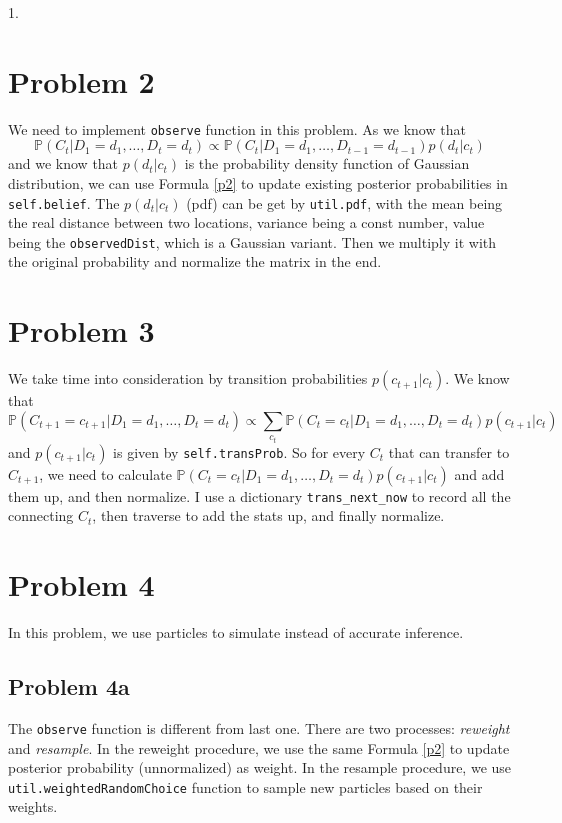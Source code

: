 \documentclass[paper=a4, fontsize=10pt]{scrartcl} %
\numberwithin{equation}{section} %
\numberwithin{figure}{section} %
\numberwithin{table}{section} %
\begin{document}
\begin{spacing}{1.}
\section{Problem 2}
We need to implement \texttt{observe} function in this problem. As we know that
\begin{equation}
\mathbb{P}(C_{t} | D_{1} = d_{1}, \ldots, D_{t} = d_{t}) \propto \mathbb{P}(C_{t} | D_{1} = d_{1}, \ldots, D_{t-1} = d_{t-1})p(d_{t}|c_{t})
\label{p2}
\end{equation}
and we know that $p(d_{t}|c_{t})$ is the probability density function of Gaussian distribution, we can use Formula \ref{p2} to update existing posterior probabilities in \texttt{self.belief}. The $p(d_{t}|c_{t})$ (pdf) can be get by \texttt{util.pdf}, with the mean being the real distance between two locations, variance being a const number, value being the \texttt{observedDist}, which is a Gaussian variant. Then we multiply it with the original probability and normalize the matrix in the end.

\section{Problem 3}
We take time into consideration by transition probabilities $p(c_{t+1}|c_{t})$.
We know that
\begin{equation}
\mathbb{P}(C_{t+1} = c_{t+1} | D_{1} = d_{1}, \ldots, D_{t} = d_{t}) \propto \sum_{c_{t}}\mathbb{P}(C_{t} = c_{t} | D_{1} = d_{1}, \ldots, D_{t} = d_{t})p(c_{t+1}|c_{t})
\end{equation}
and $p(c_{t+1}|c_{t})$ is given by \texttt{self.transProb}. So for every $C_{t}$ that can transfer to $C_{t+1}$, we need to calculate $\mathbb{P}(C_{t} = c_{t} | D_{1} = d_{1}, \ldots, D_{t} = d_{t})p(c_{t+1}|c_{t})$ and add them up, and then normalize. I use a dictionary \texttt{trans\_next\_now} to record all the connecting $C_{t}$, then traverse to add the stats up, and finally normalize.

\section{Problem 4}
In this problem, we use particles to simulate instead of accurate inference.

\subsection{Problem 4a}
The \texttt{observe} function is different from last one. There are two processes: \textit{reweight} and \textit{resample}. In the reweight procedure, we use the same Formula \ref{p2} to update posterior probability (unnormalized) as weight. In the resample procedure, we use \texttt{util.weightedRandomChoice} function to sample new particles based on their weights.


\end{spacing}
\end{document}
